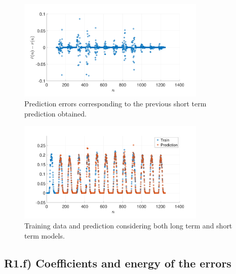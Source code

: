 \documentclass[a4paper, oneside, 11pt]{article}
\begin{document}
\begin{figure}[ht]
    \centering
    \includegraphics[width=0.8\textwidth]{figures/errors.pdf}
    \caption{Prediction errors corresponding to the previous short term prediction obtained.}
    \label{fig:errors}
\end{figure}

\begin{figure}[ht]
    \centering
    \includegraphics[width=0.8\textwidth]{figures/short_term_pred_x.pdf}
    \caption{Training data and prediction considering both long term and short term models.}
    \label{fig:x_pred2}
\end{figure}

\subsection{R1.f) Coefficients and energy of the errors}
\end{document}
